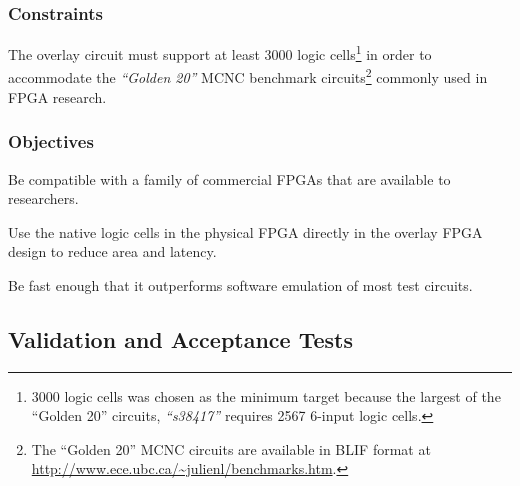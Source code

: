 \subsubsection{Constraints}

\begin{itemlist}
	\item The overlay circuit must support at least 3000 logic cells\footnote{3000 logic cells was chosen as the minimum target because the largest of the ``Golden 20'' circuits, \emph{``s38417''} requires 2567 6-input logic cells\cite{synthesis-density}.} in order to accommodate the \emph{``Golden 20''} MCNC benchmark circuits\footnote{The ``Golden 20'' MCNC circuits are available in BLIF format at \url{http://www.ece.ubc.ca/~julienl/benchmarks.htm}.} commonly used in FPGA research.
\end{itemlist}


\subsubsection{Objectives}

\begin{itemlist}
	\item Be compatible with a family of commercial FPGAs that are available to researchers.
	\item Use the native logic cells in the physical FPGA directly in the overlay FPGA design to reduce area and latency.
	\item Be fast enough that it outperforms software emulation of most test circuits.
\end{itemlist}


\subsection{Validation and Acceptance Tests}


